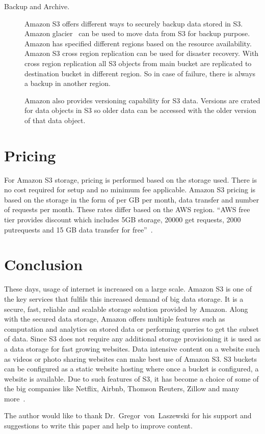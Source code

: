 \begin{description}
\item [Backup and Archive.] Amazon S3 offers different ways to securely backup 
data stored in S3. Amazon glacier~\cite{hid-sp18-420-amazon-glacier} can be 
used to move data from S3 for backup purpose. Amazon has specified different 
regions based on the resource availability. Amazon S3 cross region replication 
can be used for disaster recovery. With cross region replication all S3 
objects from main bucket are replicated to destination bucket in different
region. So in case of failure, there is always a backup in another region. 

Amazon also provides versioning capability for S3 data. Versions are crated 
for data objects in S3 so older data can be accessed with the older version of 
that data object.

\end{description}

\section{Pricing}

For Amazon S3 storage, pricing is performed based on the storage used. 
There is no cost required for setup and no minimum fee applicable. Amazon S3 
pricing is 
based on the storage in the form of per GB per month, data transfer and number 
of requests per month. These rates differ based on the AWS region. ``AWS free 
tier provides discount which includes 5GB storage, 20000 get requests, 
2000 putrequests and 15 GB data transfer for 
free''~\cite{hid-sp18-420-amazon-S3-pricing}.

\section{Conclusion}
These days, usage of internet is increased on a large scale. Amazon S3 is one 
of the key services that fulfils this increased demand of big data storage. It 
is a secure, fast, reliable and scalable storage solution provided by Amazon. 
Along with the secured data storage, Amazon offers multiple features such as 
computation and analytics on stored data or performing queries to get the 
subset of data. 
Since S3 does not require any additional storage provisioning it is used as a 
data storage for fast growing websites. Data intensive content on a website 
such as videos or photo sharing websites can make best use of Amazon S3. S3 
buckets can be configured as a static website hosting where once a bucket is 
configured, a website is available. 
Due to such features of S3, it has become a choice of some of the big 
companies like Netflix, Airbnb, Thomson Reuters, Zillow and many 
more~\cite{hid-sp18-420-amazon-S3}.

\begin{acks}

The author would like to thank Dr.~Gregor~von~Laszewski for his support and
suggestions to write this paper and help to improve content.

\end{acks}



 

